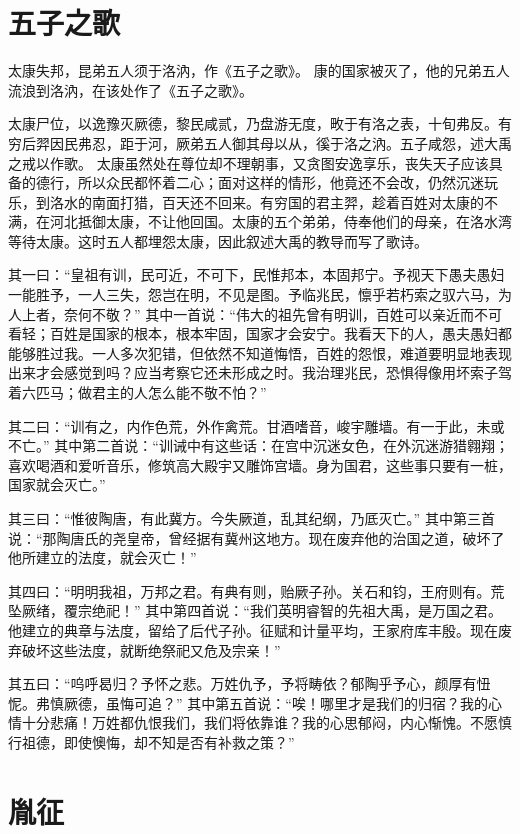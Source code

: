 \documentclass[a4paper,12pt,UTF8,twoside]{ctexbook}
\begin{document}
\chapter{五子之歌}

太康失邦，昆弟五人须于洛汭，作《五子之歌》。
康的国家被灭了，他的兄弟五人流浪到洛汭，在该处作了《五子之歌》。

太康尸位，以逸豫灭厥德，黎民咸贰，乃盘游无度，畋于有洛之表，十旬弗反。有穷后羿因民弗忍，距于河，厥弟五人御其母以从，徯于洛之汭。五子咸怨，述大禹之戒以作歌。
太康虽然处在尊位却不理朝事，又贪图安逸享乐，丧失天子应该具备的德行，所以众民都怀着二心；面对这样的情形，他竟还不会改，仍然沉迷玩乐，到洛水的南面打猎，百天还不回来。有穷国的君主羿，趁着百姓对太康的不满，在河北抵御太康，不让他回国。太康的五个弟弟，侍奉他们的母亲，在洛水湾等待太康。这时五人都埋怨太康，因此叙述大禹的教导而写了歌诗。

其一曰：“皇祖有训，民可近，不可下，民惟邦本，本固邦宁。予视天下愚夫愚妇一能胜予，一人三失，怨岂在明，不见是图。予临兆民，懔乎若朽索之驭六马，为人上者，奈何不敬？”
其中一首说：“伟大的祖先曾有明训，百姓可以亲近而不可看轻；百姓是国家的根本，根本牢固，国家才会安宁。我看天下的人，愚夫愚妇都能够胜过我。一人多次犯错，但依然不知道悔悟，百姓的怨恨，难道要明显地表现出来才会感觉到吗？应当考察它还未形成之时。我治理兆民，恐惧得像用坏索子驾着六匹马；做君主的人怎么能不敬不怕？”

其二曰：“训有之，内作色荒，外作禽荒。甘酒嗜音，峻宇雕墙。有一于此，未或不亡。”
其中第二首说：“训诫中有这些话：在宫中沉迷女色，在外沉迷游猎翱翔；喜欢喝酒和爱听音乐，修筑高大殿宇又雕饰宫墙。身为国君，这些事只要有一桩，国家就会灭亡。”

其三曰：“惟彼陶唐，有此冀方。今失厥道，乱其纪纲，乃厎灭亡。”
其中第三首说：“那陶唐氏的尧皇帝，曾经据有冀州这地方。现在废弃他的治国之道，破坏了他所建立的法度，就会灭亡！”

其四曰：“明明我祖，万邦之君。有典有则，贻厥子孙。关石和钧，王府则有。荒坠厥绪，覆宗绝祀！”
其中第四首说：“我们英明睿智的先祖大禹，是万国之君。他建立的典章与法度，留给了后代子孙。征赋和计量平均，王家府库丰殷。现在废弃破坏这些法度，就断绝祭祀又危及宗亲！”

其五曰：“呜呼曷归？予怀之悲。万姓仇予，予将畴依？郁陶乎予心，颜厚有忸怩。弗慎厥德，虽悔可追？”
其中第五首说：“唉！哪里才是我们的归宿？我的心情十分悲痛！万姓都仇恨我们，我们将依靠谁？我的心思郁闷，内心惭愧。不愿慎行祖德，即使懊悔，却不知是否有补救之策？”

\chapter{胤征}
\end{document}
